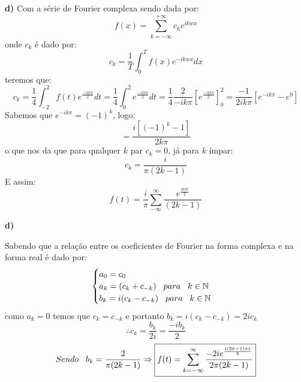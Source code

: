 \textbf{d)}
Com a série de Fourier complexa sendo dada por:
\begin{equation}
    \label{eq:Fouriercomplexa}
    f(x) = \sum^{+\infty}_{k=-\infty} c_k e^{ikwx}
\end{equation}
onde $c_k$ é dado por:
\begin{equation}
    \label{eq:ckFouerier}
    c_k = \frac{1}{T} \int^T_0 f(x)e^{-ikwx}dx
\end{equation}
teremos que:
\begin{equation*}
    c_k = \frac{1}{4}\int_{-2}^2 f(t)e^{\frac{-ikt\pi}{2}}dt = \frac{1}{4}\int_0^2e^{\frac{-ikt\pi}{2}}dt=\frac{1}{4}\frac{2}{-ik\pi}\left[e^{\frac{-ikt\pi}{2}}\right]^2_0 = \frac{-1}{2ik\pi}\left[e^{-ik\pi} - e^0 \right]
\end{equation*}
Sabemos que $e^{-ik\pi} = (-1)^k$, logo:
\begin{equation*}
    = \frac{i[(-1)^k-1]}{2k\pi}
\end{equation*}
o que nos da que para qualquer $k$ par $c_k=0$, já para $k$ ímpar:
\begin{equation*}
    \boxed{c_k =\frac{i}{\pi(2k-1)}} 
\end{equation*}
E assim:
\begin{equation*}
    \boxed{f(t) = \frac{i}{\pi}\sum^\infty_{-\infty} \frac{e^{\frac{ik\pi t}{2}}}{(2k-1)}}
\end{equation*}

\textbf{d)}

Sabendo que a relação entre os coeficientes de Fourier na forma complexa e na forma real é dado por:
\begin{equation*}
    \begin{cases}
    a_0 = c_0\\
    a_k = (c_k + c_{-k})\hspace{0.3cm}para\hspace{0.3cm}k\in\mathbb{N}\\
    b_k = i(c_k - c_{-k})\hspace{0.3cm}para\hspace{0.3cm}k\in\mathbb{N}
    \end{cases}
\end{equation*}
como $a_k = 0$ temos que $c_k = c_{-k}$ e portanto $b_k = i(c_k - c_{-k}) = 2ic_k$
\begin{equation*}
    \therefore c_k = \frac{b_k}{2i} = \frac{-ib_k}{2}
\end{equation*}
\begin{equation*}
    Sendo\hspace{0.3cm} b_k = \frac{2}{\pi(2k-1)}\Rightarrow \boxed{f(t) = \sum_{k=-\infty}^\infty \frac{-2ie^{\frac{i(2k-1)\pi t}{2}}}{2\pi(2k-1)}} 
\end{equation*}
